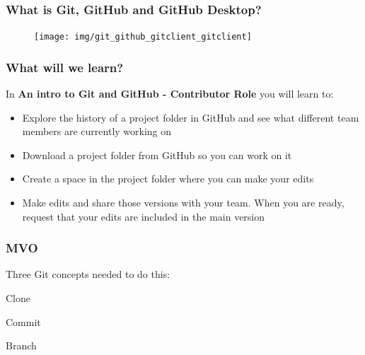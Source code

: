 \documentclass[aspectratio=169]{beamer}
\begin{document}
\begin{frame}
	\frametitle{What is Git, GitHub and GitHub Desktop?}
	\begin{figure}
		\centering
		\texttt{[image: img/git\_github\_gitclient\_gitclient]}
		\label{fig:gitgithubgitclient_gitclient}
	\end{figure}
\end{frame}

\begin{frame}
\frametitle{What will we learn?}

	In \textbf{An intro to Git and GitHub - Contributor Role} you will learn to:

	\begin{itemize}
		\item Explore the history of a project folder in GitHub and see what different team members are currently working on
		\item Download a project folder from GitHub so you can work on it
		\item Create a space in the project folder where you can make your edits
		\item Make edits and share those versions with your team. When you are ready, request that your edits are included in the main version
	\end{itemize}

\end{frame}


\begin{frame}
\frametitle{MVO}

	\hspace*{2.5cm}\Large{Three Git concepts needed to do this:}

	\begin{itemize}
		\setlength{\itemindent}{3cm}
		\Large{\item Clone}
		\Large{\item Commit}
		\Large{\item Branch}
	\end{itemize}

\end{frame}
\end{document}
